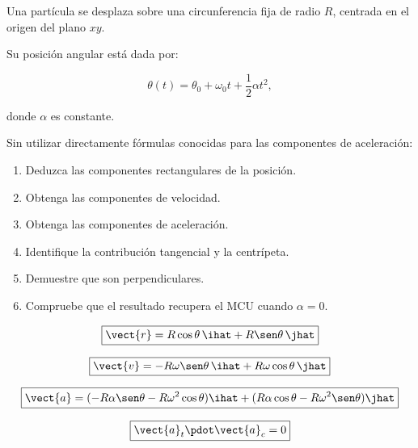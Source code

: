 \nivelavanzado

\begin{ejercicio}
Una partícula se desplaza sobre una circunferencia fija de
radio \(R\), centrada en el origen del plano \(xy\).

Su posición angular está dada por:

\[
\theta(t)=\theta_0+\omega_0t+\frac12\alpha t^2,
\]

donde \(\alpha\) es constante.

Sin utilizar directamente fórmulas conocidas para las
componentes de aceleración:

\begin{enumerate}[label=\alph*)]
    \item Deduzca las componentes rectangulares de la posición.
    \item Obtenga las componentes de velocidad.
    \item Obtenga las componentes de aceleración.
    \item Identifique la contribución tangencial y la centrípeta.
    \item Demuestre que son perpendiculares.
    \item Compruebe que el resultado recupera el MCU cuando
    \(\alpha=0\).
\end{enumerate}
\end{ejercicio}

\begin{respuesta}
\[
\boxed{
\vect{r}=R\cos\theta\,\ihat+R\sen\theta\,\jhat
}
\]

\[
\boxed{
\vect{v}=-R\omega\sen\theta\,\ihat
+R\omega\cos\theta\,\jhat
}
\]

\[
\boxed{
\vect{a}
=
(-R\alpha\sen\theta-R\omega^2\cos\theta)\ihat
+
(R\alpha\cos\theta-R\omega^2\sen\theta)\jhat
}
\]

\[
\boxed{
\vect{a}_t\pdot\vect{a}_c=0
}
\]
\end{respuesta}

